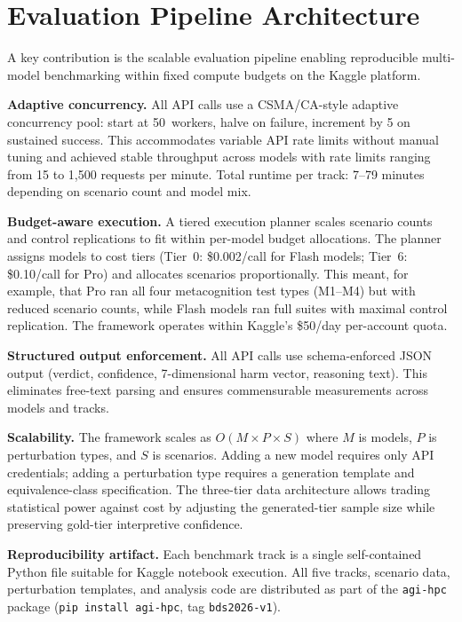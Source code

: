\documentclass[conference]{IEEEtran}
\begin{document}
\section{Evaluation Pipeline Architecture}

A key contribution is the scalable evaluation pipeline enabling reproducible multi-model benchmarking within fixed compute budgets on the Kaggle platform.

\textbf{Adaptive concurrency.} All API calls use a CSMA/CA-style adaptive concurrency pool: start at 50~workers, halve on failure, increment by 5 on sustained success. This accommodates variable API rate limits without manual tuning and achieved stable throughput across models with rate limits ranging from 15 to 1,500 requests per minute. Total runtime per track: 7--79 minutes depending on scenario count and model mix.

\textbf{Budget-aware execution.} A tiered execution planner scales scenario counts and control replications to fit within per-model budget allocations. The planner assigns models to cost tiers (Tier~0: \$0.002/call for Flash models; Tier~6: \$0.10/call for Pro) and allocates scenarios proportionally. This meant, for example, that Pro ran all four metacognition test types (M1--M4) but with reduced scenario counts, while Flash models ran full suites with maximal control replication. The framework operates within Kaggle's \$50/day per-account quota.

\textbf{Structured output enforcement.} All API calls use schema-enforced JSON output (verdict, confidence, 7-dimensional harm vector, reasoning text). This eliminates free-text parsing and ensures commensurable measurements across models and tracks.

\textbf{Scalability.} The framework scales as $O(M \times P \times S)$ where $M$ is models, $P$ is perturbation types, and $S$ is scenarios. Adding a new model requires only API credentials; adding a perturbation type requires a generation template and equivalence-class specification. The three-tier data architecture allows trading statistical power against cost by adjusting the generated-tier sample size while preserving gold-tier interpretive confidence.

\textbf{Reproducibility artifact.} Each benchmark track is a single self-contained Python file suitable for Kaggle notebook execution. All five tracks, scenario data, perturbation templates, and analysis code are distributed as part of the \texttt{agi-hpc} package (\texttt{pip install agi-hpc}, tag \texttt{bds2026-v1}).
\end{document}
